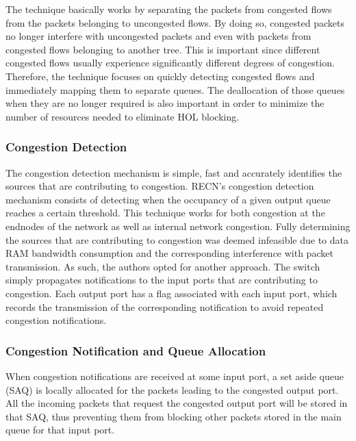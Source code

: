 \documentclass[12pt]{article}
\begin{document}
The technique basically works by separating the packets from congested flows from the packets belonging to uncongested flows. By doing so, congested packets no longer interfere with uncongested packets and even with packets from congested flows belonging to another tree. This is important since different congested flows usually experience significantly different degrees of congestion. Therefore, the technique focuses on quickly detecting congested flows and immediately mapping them to separate queues. The deallocation of those queues when they are no longer required is also important in order to minimize the number of resources needed to eliminate HOL blocking.

\subsubsection{Congestion Detection}

The congestion detection mechanism is simple, fast and accurately identifies the sources that are contributing to congestion. RECN's congestion detection mechanism consists of detecting when the occupancy of a given output queue reaches a certain threshold. This technique works for both congestion at the endnodes of the network as well as internal network congestion. Fully determining the sources that are contributing to congestion was deemed infeasible due to data RAM bandwidth consumption and the corresponding interference with packet transmission. As such, the authors opted for another approach. The switch simply propagates notifications to the input ports that are contributing to congestion. Each output port has a flag associated with each input port, which records the transmission of the corresponding notification to avoid repeated congestion notifications.

\subsubsection{Congestion Notification and Queue Allocation}

When congestion notifications are received at some input port, a set aside queue (SAQ) is locally allocated for the packets leading to the congested output port. All the incoming packets that request the congested output port will be stored in that SAQ, thus preventing them from blocking other packets stored in the main queue for that input port.
\end{document}
